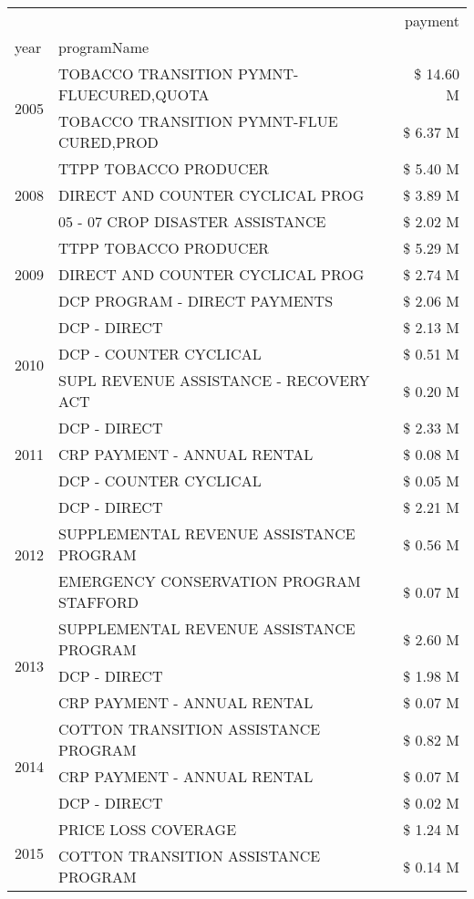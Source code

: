 \begin{tabular}{llr}
\toprule
 &  & payment \\
year & programName &  \\
\midrule
\multirow[t]{2}{*}{2005} & TOBACCO TRANSITION PYMNT-FLUECURED,QUOTA & \$ 14.60 M \\
 & TOBACCO TRANSITION PYMNT-FLUE CURED,PROD & \$ 6.37 M \\
\cline{1-3}
\multirow[t]{3}{*}{2008} & TTPP TOBACCO PRODUCER & \$ 5.40 M \\
 & DIRECT AND COUNTER CYCLICAL PROG & \$ 3.89 M \\
 & 05 - 07 CROP DISASTER ASSISTANCE & \$ 2.02 M \\
\cline{1-3}
\multirow[t]{3}{*}{2009} & TTPP TOBACCO PRODUCER & \$ 5.29 M \\
 & DIRECT AND COUNTER CYCLICAL PROG & \$ 2.74 M \\
 & DCP PROGRAM - DIRECT PAYMENTS & \$ 2.06 M \\
\cline{1-3}
\multirow[t]{3}{*}{2010} & DCP - DIRECT & \$ 2.13 M \\
 & DCP - COUNTER CYCLICAL & \$ 0.51 M \\
 & SUPL REVENUE ASSISTANCE - RECOVERY ACT & \$ 0.20 M \\
\cline{1-3}
\multirow[t]{3}{*}{2011} & DCP - DIRECT & \$ 2.33 M \\
 & CRP PAYMENT - ANNUAL RENTAL & \$ 0.08 M \\
 & DCP - COUNTER CYCLICAL & \$ 0.05 M \\
\cline{1-3}
\multirow[t]{3}{*}{2012} & DCP - DIRECT & \$ 2.21 M \\
 & SUPPLEMENTAL REVENUE ASSISTANCE PROGRAM & \$ 0.56 M \\
 & EMERGENCY CONSERVATION PROGRAM STAFFORD & \$ 0.07 M \\
\cline{1-3}
\multirow[t]{3}{*}{2013} & SUPPLEMENTAL REVENUE ASSISTANCE PROGRAM & \$ 2.60 M \\
 & DCP - DIRECT & \$ 1.98 M \\
 & CRP PAYMENT - ANNUAL RENTAL & \$ 0.07 M \\
\cline{1-3}
\multirow[t]{3}{*}{2014} & COTTON TRANSITION ASSISTANCE PROGRAM & \$ 0.82 M \\
 & CRP PAYMENT - ANNUAL RENTAL & \$ 0.07 M \\
 & DCP - DIRECT & \$ 0.02 M \\
\cline{1-3}
\multirow[t]{3}{*}{2015} & PRICE LOSS COVERAGE & \$ 1.24 M \\
 & COTTON TRANSITION ASSISTANCE PROGRAM & \$ 0.14 M \\

\end{tabular}
